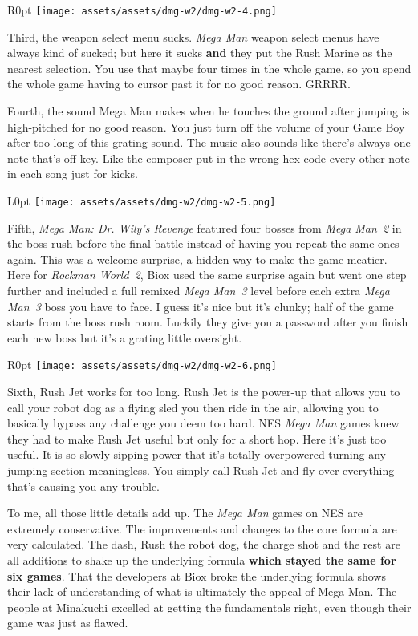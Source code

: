 \documentclass{book}
\begin{document}
\begin{wrapfigure}{R}{0pt} \texttt{[image: assets/assets/dmg-w2/dmg-w2-4.png]}\end{wrapfigure}
Third, the weapon select menu sucks. \emph{Mega Man} weapon select menus have always kind of sucked; but here it sucks \textbf{and} they put the Rush Marine as the nearest selection. You use that maybe four times in the whole game, so you spend the whole game having to cursor past it for no good reason. GRRRR.

Fourth, the sound Mega Man makes when he touches the ground after jumping is high-pitched for no good reason. You just turn off the volume of your Game Boy after too long of this grating sound. The music also sounds like there’s always one note that’s off-key. Like the composer put in the wrong hex code every other note in each song just for kicks.

\begin{wrapfigure}{L}{0pt} \texttt{[image: assets/assets/dmg-w2/dmg-w2-5.png]}\end{wrapfigure}
Fifth, \emph{Mega Man: Dr. Wily’s Revenge} featured four bosses from \emph{Mega Man 2} in the boss rush before the final battle instead of having you repeat the same ones again. This was a welcome surprise, a hidden way to make the game meatier. Here for \emph{Rockman World 2}, Biox used the same surprise again but went one step further and included a full remixed \emph{Mega Man 3} level before each extra \emph{Mega Man 3} boss you have to face. I guess it’s nice but it’s clunky; half of the game starts from the boss rush room. Luckily they give you a password after you finish each new boss but it’s a grating little oversight.

\begin{wrapfigure}{R}{0pt} \texttt{[image: assets/assets/dmg-w2/dmg-w2-6.png]}\end{wrapfigure}
Sixth, Rush Jet works for too long. Rush Jet is the power-up that allows you to call your robot dog as a flying sled you then ride in the air, allowing you to basically bypass any challenge you deem too hard. NES \emph{Mega Man} games knew they had to make Rush Jet useful but only for a short hop. Here it’s just too useful. It is so slowly sipping power that it’s totally overpowered turning any jumping section meaningless. You simply call Rush Jet and fly over everything that’s causing you any trouble.

To me, all those little details add up. The \emph{Mega Man} games on NES are extremely conservative. The improvements and changes to the core formula are very calculated. The dash, Rush the robot dog, the charge shot and the rest are all additions to shake up the underlying formula \textbf{which stayed the same for six games}. That the developers at Biox broke the underlying formula shows their lack of understanding of what is ultimately the appeal of Mega Man. The people at Minakuchi excelled at getting the fundamentals right, even though their game was just as flawed.
\end{document}
